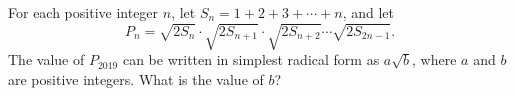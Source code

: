For each positive integer $n$, let $S_n=1+2+3+\cdots+n$, and let
\[P_n=\sqrt{2S_n}\cdot\sqrt{2S_{n+1}}\cdot\sqrt{2S_{n+2}}\cdots\sqrt{2S_{2n-1}}.\]
The value of $P_{2019}$ can be written in simplest radical form as $a\sqrt b$, where $a$ and $b$ are positive integers. What is the value of $b$?
